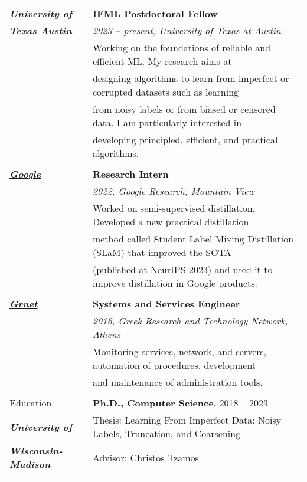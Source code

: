 \documentclass[letterpaper,11pt,oneside]{article}
\begin{document}
\noindent \begin{longtable}{@{} l l}

\href{https://www.ifml.institute}{\emph{\textbf{University of}}} 
  & \textbf{IFML Postdoctoral Fellow} \\

\href{https://www.ifml.institute}
{\textbf{\emph{Texas Austin}}}  & \emph{2023 -- present, University of Texas at Austin} \\
& Working on the foundations of reliable and efficient ML.
 My research aims at \\ 
& designing algorithms to 
learn from  imperfect or corrupted datasets such
 as learning \\
 & from noisy labels or from biased or censored data. I am particularly interested in \\
 & developing principled, efficient, and practical algorithms. \\
  & \\

\href{https://research.google}{\emph{\textbf{Google}}}
  &\textbf{Research Intern} \\
  & \emph{2022, Google Research, Mountain View}\\
  & Worked on semi-supervised distillation.  Developed a new practical distillation \\ 
  & method called Student Label Mixing Distillation (SLaM) that improved the SOTA \\
  & (published at NeurIPS 2023) and used it to improve distillation in Google products. \\
  & \\

  \href{https://grnet.gr/}{\emph{\textbf{Grnet}}}
  &\textbf{Systems and Services Engineer} \\
  & \emph{2016, Greek Research and Technology Network, Athens}\\
  & Monitoring services, network, and servers, automation of procedures, development \\ 
  & and maintenance of administration tools. \\
  &\\

 \Large{Education}

     & \textbf{Ph.D., Computer Science}, 2018 -- 2023 \\
      \emph{\textbf{University of}}
     & Thesis: Learning From Imperfect Data: 
      Noisy Labels, Truncation, and Coarsening \\
      \emph{\textbf{Wisconsin-Madison} }
     & Advisor: Christos Tzamos\\
     & \\


\end{longtable}
\end{document}
